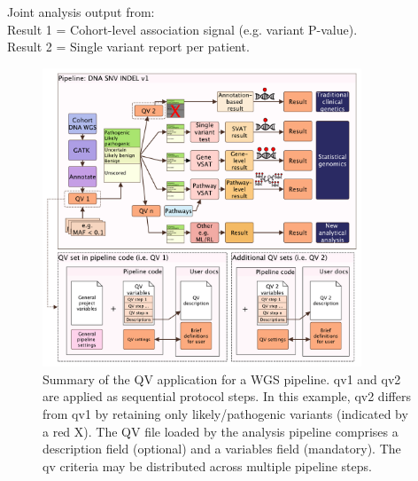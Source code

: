 \begin{tcolorbox}[
    colback=white!0,
    colframe=black,
    boxrule=1pt,
    arc=1mm,
    outer arc=1mm,
    title=\textbf{\refstepcounter{myboxcounter}\label{box:pipe}Box \themyboxcounter: Example diagrammatic representation}
]
\medskip

Joint analysis output from:\\
Result 1 = Cohort-level association signal (e.g. variant P-value).\\
Result 2 = Single variant report per patient.
\end{tcolorbox}

\begin{figure}[h]
\centering
\includegraphics[width=0.85\textwidth]{./images/qv_pipeline_with_file_vcurrent.pdf}
\caption{Summary of the QV application for a WGS pipeline. \ac{qv}1 and \ac{qv}2 are applied as sequential protocol steps. In this example, \ac{qv}2 differs from \ac{qv}1 by retaining only likely/pathogenic variants (indicated by a red X). The QV file loaded by the analysis pipeline comprises a description field (optional) and a variables field (mandatory). The \ac{qv} criteria may be distributed across multiple pipeline steps.}
\label{fig:qv_pipeline_with_file_vcurrent}
\end{figure}

